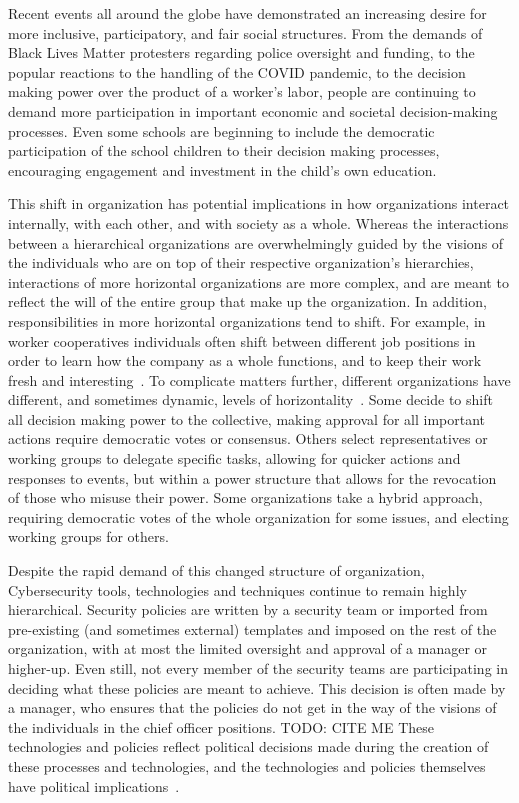 Recent events all around the globe have demonstrated an increasing desire for
more inclusive, participatory, and fair social structures. From the demands of
Black Lives Matter protesters regarding police oversight and funding, to the
popular reactions to the handling of the COVID pandemic, to the decision making
power over the product of a worker's labor, people are continuing to demand more
participation in important economic and societal decision-making processes. %
Even some schools are beginning to include the democratic participation of the
school children to their decision making processes, encouraging engagement and
investment in the child's own education.~\cite{pacheco2008escola}

This shift in organization has potential implications in how organizations
interact internally, with each other, and with society as a whole. Whereas the
interactions between a hierarchical organizations are overwhelmingly guided by
the visions of the individuals who are on top of their respective organization's
hierarchies, interactions of more horizontal organizations are more complex, and
are meant to reflect the will of the entire group that make up the organization.
In addition, responsibilities in more horizontal organizations tend to shift.
For example, in worker cooperatives individuals often shift between different
job positions in order to learn how the company as a whole functions, and to
keep their work fresh and 
interesting~\cite{jackall19846, wright2014worker, lindenfeld1982workplace}.
To complicate matters further, different organizations have different, and
sometimes dynamic, levels of  horizontality~\cite{wright2014worker}. Some decide
to shift all decision making power to the collective, making approval for all
important actions require democratic votes or consensus. Others select
representatives or working groups to delegate specific tasks, allowing for
quicker actions and responses to events, but within a power structure that
allows for the revocation of those who misuse their power. Some organizations
take a hybrid approach, requiring democratic votes of the whole organization for
some issues, and electing working groups for others.

Despite the rapid demand of this changed structure of organization, 
Cybersecurity tools, technologies and techniques continue to remain highly 
hierarchical. Security policies are written by a security team or imported from
pre-existing (and sometimes external) templates and imposed on the rest of the
organization, with at most the limited oversight and approval of a manager or
higher-up. Even still, not every member of the security teams are participating
in deciding what these policies are meant to achieve. This decision is often
made by a manager, who ensures that the policies do not get in the way of the
visions of the individuals in the chief officer positions. {\color{red}TODO: CITE ME} These technologies
and policies reflect political decisions made during the creation of these
processes and technologies, and the technologies and policies themselves have
political implications~\cite{winner1980artifacts}.

